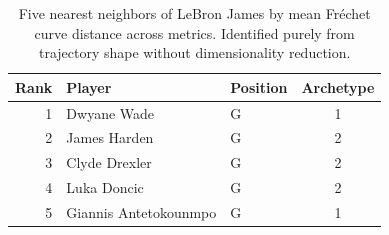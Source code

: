 \begin{table}[htbp]
  \centering\small
  \begin{tabular}{rllc}
    \toprule
    Rank & Player & Position & Archetype \\
    \midrule
    1 & Dwyane Wade & G & 1 \\
    2 & James Harden & G & 2 \\
    3 & Clyde Drexler & G & 2 \\
    4 & Luka Doncic & G & 2 \\
    5 & Giannis Antetokounmpo & G & 1 \\
    \bottomrule
  \end{tabular}
  \caption{Five nearest neighbors of LeBron James by mean Fr\'{e}chet curve distance across metrics. Identified purely from trajectory shape without dimensionality reduction.}
  \label{tab:LeBron_James_frechet_curve_neighbors}
\end{table}

